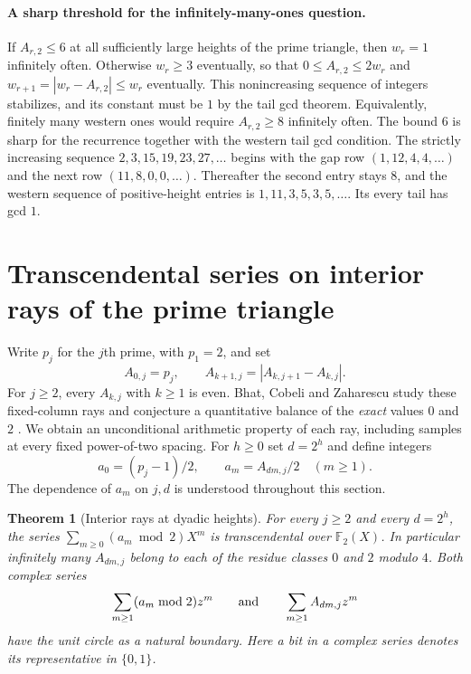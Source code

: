 \documentclass[11pt,a4paper]{article}
\newtheorem{theorem}{Theorem}[section]
\begin{document}
\paragraph{A sharp threshold for the infinitely-many-ones question.}
If $A_{r,2}\le6$ at all sufficiently large heights of the prime triangle,
then $w_r=1$ infinitely often. Otherwise $w_r\ge3$ eventually, so that
$0\le A_{r,2}\le2w_r$ and $w_{r+1}=|w_r-A_{r,2}|\le w_r$ eventually.
This nonincreasing sequence of integers stabilizes, and its constant must
be $1$ by the tail gcd theorem. Equivalently, finitely many western ones
would require $A_{r,2}\ge8$ infinitely often. The bound $6$ is sharp
for the recurrence together with the western tail gcd condition. The
strictly increasing sequence $2,3,15,19,23,27,\ldots$ begins with the
gap row $(1,12,4,4,\ldots)$ and the next row $(11,8,0,0,\ldots)$.
Thereafter the second entry stays $8$, and the western sequence of
positive-height entries is $1,11,3,5,3,5,\ldots$. Its every tail has
gcd $1$.

\section{Transcendental series on interior rays of the prime triangle}
\label{ray:sec}

Write $p_j$ for the $j$th prime, with $p_1=2$, and set
\[
 A_{0,j}=p_j,\qquad A_{k+1,j}=|A_{k,j+1}-A_{k,j}|.
\]
For $j\ge2$, every $A_{k,j}$ with $k\ge1$ is even. Bhat, Cobeli and Zaharescu study these fixed-column rays and conjecture a quantitative balance of the \emph{exact} values $0$ and $2$ \cite[Conjecture~2]{bcz2}. We obtain an unconditional arithmetic property of each ray, including samples at every fixed power-of-two spacing. For $h\ge0$ set $d=2^h$ and define integers
\[
 a_0=(p_j-1)/2,\qquad a_m=A_{dm,j}/2\quad(m\ge1).
\]
The dependence of $a_m$ on $j,d$ is understood throughout this section.

\begin{theorem}[Interior rays at dyadic heights]\label{ray:main}
For every $j\ge2$ and every $d=2^h$, the series $\sum_{m\ge0}(a_m\bmod 2)X^m$ is transcendental over $\mathbb F_2(X)$. In particular infinitely many $A_{dm,j}$ belong to each of the residue classes $0$ and $2$ modulo $4$. Both complex series
\[
 \sum_{m\ge1}(a_m\bmod 2)z^m
 \qquad\hbox{and}\qquad
 \sum_{m\ge1}A_{dm,j}z^m
\]
have the unit circle as a natural boundary. Here a bit in a complex series denotes its representative in $\{0,1\}$.\end{theorem}
\end{document}
